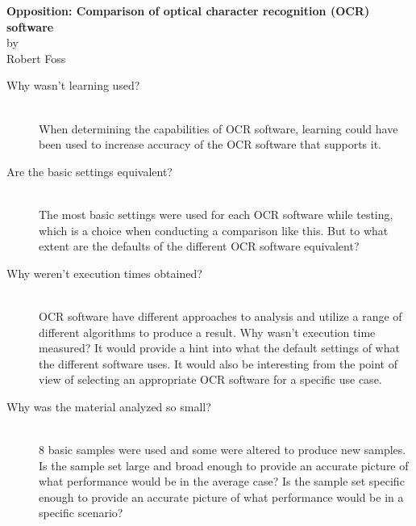 \documentclass[12pt,a4paper,onecolumn, openright]{report}
\begin{document}
\thispagestyle{empty}

\begin{center}
\textbf{\Large Opposition: Comparison of optical character recognition (OCR) software\\}
\vspace{0.25cm}
by\\
\vspace{0.25cm}
Robert Foss
\end{center}

\begin{description}
  \item[Why wasn't learning used?] \hfill \\
  When determining the capabilities of OCR software, learning could have been used to increase accuracy of the OCR software that supports it.
  \item[Are the basic settings equivalent?] \hfill \\
  The most basic settings were used for each OCR software while testing, which is a choice when conducting a comparison like this. But to what extent are the defaults of the different OCR software equivalent?
  \item[Why weren't execution times obtained?] \hfill \\
  OCR software have different approaches to analysis and utilize a range of different algorithms to produce a result. Why wasn't execution time measured? It would provide a hint into what the default settings of what the different software uses. It would also be interesting from the point of view of selecting an appropriate OCR software for a specific use case.
  \item[Why was the material analyzed so small?] \hfill \\
  8 basic samples were used and some were altered to produce new samples. Is the sample set large and broad enough to provide an accurate picture of what performance would be in the average case? Is the sample set specific enough to provide an accurate picture of what performance would be in a specific scenario?
\end{description}
\end{document}

